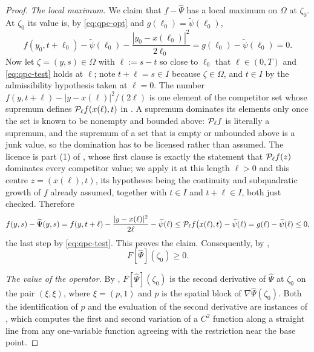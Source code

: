 \begin{proof}
\emph{The local maximum.}
We claim that $f-\widehat\Psi$ has a local maximum on $\Omega$ at $\zeta_0$. At
$\zeta_0$ its value is, by \eqref{eq:qpc-opt} and $g(\ell_0)=\widetilde\psi(\ell_0)$,
\[
  f(y_0,t+\ell_0)-\widetilde\psi(\ell_0)-\frac{|y_0-x(\ell_0)|^2}{2\ell_0}
   =g(\ell_0)-\widetilde\psi(\ell_0)=0 .
\]
Now let $\zeta=(y,s)\in\Omega$ with $\ell:=s-t$ so close to $\ell_0$ that
$\ell\in(0,T)$ and \eqref{eq:qpc-test} holds at $\ell$; note $t+\ell=s\in I$
because $\zeta\in\Omega$, and $t\in I$ by the admissibility hypothesis taken at
$\ell=0$. The number $f(y,t+\ell)-|y-x(\ell)|^2/(2\ell)$ is one element of the
competitor set whose supremum defines $\mathcal{P}_\ell f(x(\ell),t)$ in
. A supremum dominates its elements only once the set is known to
be nonempty and bounded above: $\mathcal{P}_\ell f$ is literally a supremum, and the
supremum of a set that is empty or unbounded above is a junk value, so the
domination has to be licensed rather than assumed. The licence is part (1) of
, whose first clause is exactly the statement that
$\mathcal{P}_\ell f(z)$ dominates every competitor value; we apply it at this length
$\ell>0$ and this centre $z=(x(\ell),t)$, its hypotheses being the continuity and
subquadratic growth of $f$ already assumed, together with $t\in I$ and
$t+\ell\in I$, both just checked. Therefore
\[
  f(y,s)-\widehat\Psi(y,s)
   =f(y,t+\ell)-\frac{|y-x(\ell)|^2}{2\ell}-\widetilde\psi(\ell)
   \le\mathcal{P}_\ell f\bigl(x(\ell),t\bigr)-\widetilde\psi(\ell)
   =g(\ell)-\widetilde\psi(\ell)\le0 ,
\]
the last step by \eqref{eq:qpc-test}. This proves the claim. Consequently, by
,
\begin{equation}\label{eq:qpc-visc}
  F[\widehat\Psi](\zeta_0)\ge0 .
\end{equation}

\emph{The value of the operator.}
By , $F[\widehat\Psi](\zeta_0)$ is the second derivative of
$\widehat\Psi$ at $\zeta_0$ on the pair $(\xi,\xi)$, where $\xi=(p,1)$ and $p$ is
the spatial block of $\nabla\widehat\Psi(\zeta_0)$. Both the identification of $p$
and the evaluation of the second derivative are instances of
, which computes the first and second variation of
a $C^2$ function along a straight line from any one-variable function agreeing with
the restriction near the base point.


\end{proof}
